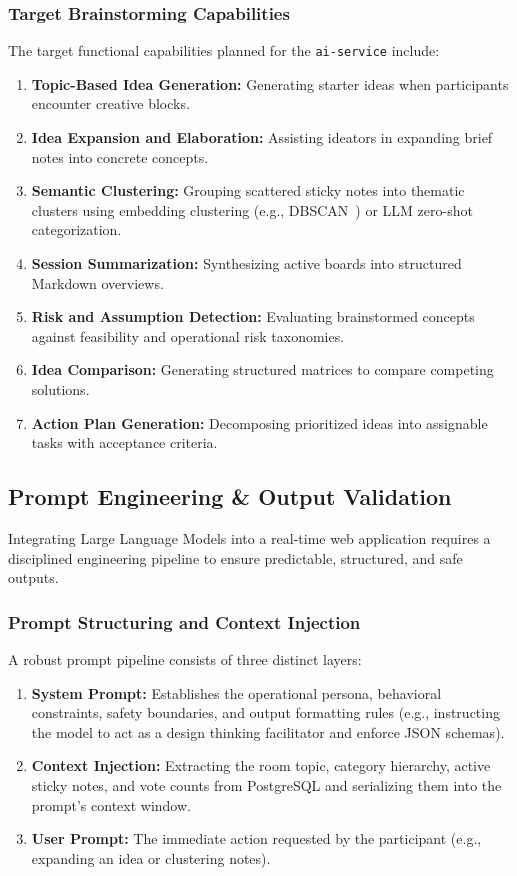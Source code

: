 \subsubsection{Target Brainstorming Capabilities}
The target functional capabilities planned for the \texttt{ai-service} include:
\begin{enumerate}
    \item \textbf{Topic-Based Idea Generation:} Generating starter ideas when participants encounter creative blocks.
    \item \textbf{Idea Expansion and Elaboration:} Assisting ideators in expanding brief notes into concrete concepts.
    \item \textbf{Semantic Clustering:} Grouping scattered sticky notes into thematic clusters using embedding clustering (e.g., DBSCAN~\cite{ester1996density}) or LLM zero-shot categorization.
    \item \textbf{Session Summarization:} Synthesizing active boards into structured Markdown overviews.
    \item \textbf{Risk and Assumption Detection:} Evaluating brainstormed concepts against feasibility and operational risk taxonomies.
    \item \textbf{Idea Comparison:} Generating structured matrices to compare competing solutions.
    \item \textbf{Action Plan Generation:} Decomposing prioritized ideas into assignable tasks with acceptance criteria.
\end{enumerate}


\subsection{Prompt Engineering \& Output Validation}
\label{subsec:prompt_engineering}

Integrating Large Language Models into a real-time web application requires a disciplined engineering pipeline to ensure predictable, structured, and safe outputs.

\subsubsection{Prompt Structuring and Context Injection}
A robust prompt pipeline consists of three distinct layers:
\begin{enumerate}
    \item \textbf{System Prompt:} Establishes the operational persona, behavioral constraints, safety boundaries, and output formatting rules (e.g., instructing the model to act as a design thinking facilitator and enforce JSON schemas).
    \item \textbf{Context Injection:} Extracting the room topic, category hierarchy, active sticky notes, and vote counts from PostgreSQL and serializing them into the prompt's context window.
    \item \textbf{User Prompt:} The immediate action requested by the participant (e.g., expanding an idea or clustering notes).
\end{enumerate}

